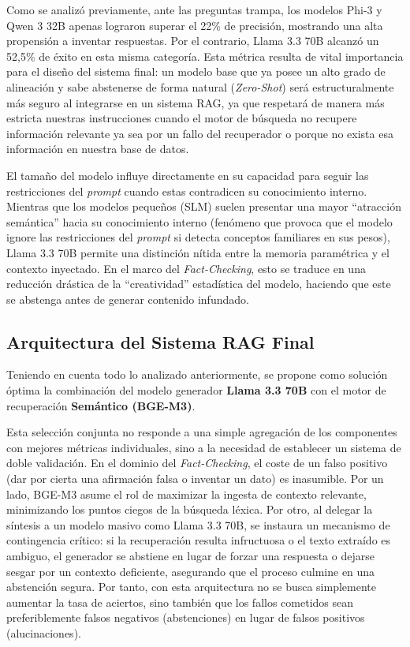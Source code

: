 Como se analizó previamente, ante las preguntas trampa, los modelos Phi-3 y Qwen 3 32B apenas lograron superar el 22\% de precisión, mostrando una alta propensión a inventar respuestas. Por el contrario, Llama 3.3 70B alcanzó un 52,5\% de éxito en esta misma categoría. Esta métrica resulta de vital importancia para el diseño del sistema final: un modelo base que ya posee un alto grado de alineación y sabe abstenerse de forma natural (\textit{Zero-Shot}) será estructuralmente más seguro al integrarse en un sistema RAG, ya que respetará de manera más estricta nuestras instrucciones cuando el motor de búsqueda no recupere información relevante  ya sea por un fallo del recuperador o porque no exista esa información en nuestra base de datos.

El tamaño del modelo influye directamente en su capacidad para seguir las restricciones del \textit{prompt} cuando estas contradicen su conocimiento interno. Mientras que los modelos pequeños (SLM) suelen presentar una mayor ``atracción semántica'' hacia su conocimiento interno (fenómeno que provoca que el modelo ignore las restricciones del \textit{prompt} si detecta conceptos familiares en sus pesos), Llama 3.3 70B permite una distinción nítida entre la memoria paramétrica y el contexto inyectado. En el marco del \textit{Fact-Checking}, esto se traduce en una reducción drástica de la ``creatividad'' estadística del modelo, haciendo que este se abstenga antes de generar contenido infundado.

\subsection{Arquitectura del Sistema RAG Final}

Teniendo en cuenta todo lo analizado anteriormente, se propone como solución óptima la combinación del modelo generador \textbf{Llama 3.3 70B} con el motor de recuperación \textbf{Semántico (BGE-M3)}. 

Esta selección conjunta no responde a una simple agregación de los componentes con mejores métricas individuales, sino a la necesidad de establecer un sistema de doble validación. En el dominio del \textit{Fact-Checking}, el coste de un falso positivo (dar por cierta una afirmación falsa o inventar un dato) es inasumible. Por un lado, BGE-M3 asume el rol de maximizar la ingesta de contexto relevante, minimizando los puntos ciegos de la búsqueda léxica. Por otro, al delegar la síntesis a un modelo masivo como Llama 3.3 70B, se instaura un mecanismo de contingencia crítico: si la recuperación resulta infructuosa o el texto extraído es ambiguo, el generador se abstiene en lugar de forzar una respuesta o dejarse sesgar por un contexto deficiente, asegurando que el proceso culmine en una abstención segura. Por tanto, con esta arquitectura no se busca simplemente aumentar la tasa de aciertos, sino también que los fallos cometidos sean preferiblemente falsos negativos (abstenciones) en lugar de falsos positivos (alucinaciones).

